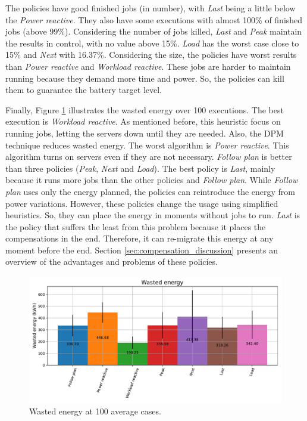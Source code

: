 The policies have good finished jobs (in number), with \emph{Last} being a little below the \emph{Power reactive}. They also have some executions with almost 100\% of finished jobs (above 99\%). Considering the number of jobs killed, \emph{Last} and \emph{Peak} maintain the results in control, with no value above 15\%. \emph{Load} has the worst case close to 15\% and \emph{Next} with 16.37\%. Considering the size, the policies have worst results than \emph{Power reactive} and \emph{Workload reactive}. These jobs are harder to maintain running because they demand more time and power. So, the policies can kill them to guarantee the battery target level.

Finally, Figure \ref{fig:energy_diff} illustrates the wasted energy over 100 executions. The best execution is \emph{Workload reactive}. As mentioned before, this heuristic focus on running jobs, letting the servers down until they are needed. Also, the DPM technique reduces wasted energy. The worst algorithm is \emph{Power reactive}. This algorithm turns on servers even if they are not necessary. \emph{Follow plan} is better than three policies (\emph{Peak}, \emph{Next} and \emph{Load}). The best policy is \emph{Last}, mainly because it runs more jobs than the other policies and \emph{Follow plan}. While \emph{Follow plan} uses only the energy planned, the policies can reintroduce the energy from power variations. However, these policies change the usage using simplified heuristics. So, they can place the energy in moments without jobs to run. \emph{Last} is the policy that suffers the least from this problem because it places the compensations in the end. Therefore, it can re-migrate this energy at any moment before the end. Section \ref{sec:compensation_discussion} presents an overview of the advantages and problems of these policies. 

\begin{figure}[!htb]
    \centering
    \includegraphics[scale=0.55]{Images/Compensations/energy_diff.pdf}
    \caption{Wasted energy at 100 average cases.}
    \label{fig:energy_diff}
\end{figure}

